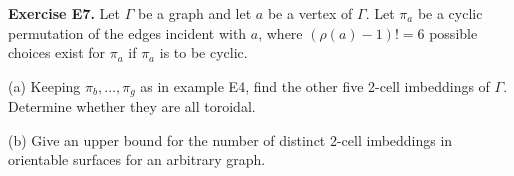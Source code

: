 \textbf{Exercise E7.}
Let $\Gamma$ be a graph and let $a$ be a vertex of $\Gamma$. Let $\pi_a$ be a cyclic permutation of the edges incident with $a$, where $(\rho(a) - 1)! = 6$ possible choices exist for $\pi_a$ if $\pi_a$ is to be cyclic.

(a) Keeping $\pi_b, \ldots, \pi_g$ as in example E4, find the other five 2-cell imbeddings of $\Gamma$. Determine whether they are all toroidal.

(b) Give an upper bound for the number of distinct 2-cell imbeddings in orientable surfaces for an arbitrary graph.

